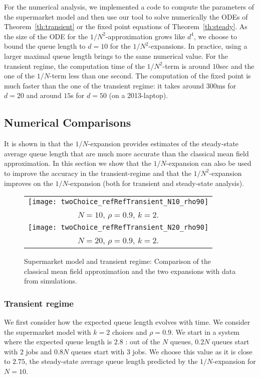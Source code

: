 \documentclass[sigconf]{acmart}
\begin{document}
For the numerical analysis, we implemented a code to compute the
parameters of the supermarket model and then use our tool
\cite{rmfTool2018} to solve numerically the ODEs of
Theorem~\ref{th:transient} or the fixed point equations of
Theorem~\ref{th:steady}. As the size of the ODE for the
$1/N^2$-approximation grows like $d^4$, we choose to bound the queue
length to $d=10$ for the $1/N^2$-expansions. In practice, using a
larger maximal queue length brings to the same numerical value.  For
the transient regime, the computation time of the $1/N^2$-term is
around $10$sec and the one of the $1/N$-term less than one second.
The computation of the fixed point is much faster than the one of the
transient regime: it takes around $300$ms for $d=20$ and around $15$s
for $d=50$ (on a 2013-laptop).


\subsection{Numerical Comparisons}

It is shown in \cite{gast2017refined} that the $1/N$-expansion
provides estimates of the steady-state average queue length that are
much more accurate than the classical mean field approximation. In
this section we show that the $1/N$-expansion can also be used to
improve the accuracy in the transient-regime and that the
$1/N^2$-expansion improves on the $1/N$-expansion (both for transient
and steady-state analysis).


\begin{figure}[t]
  \centering
  \begin{tabular}{c}
    \texttt{[image: twoChoice\_refRefTransient\_N10\_rho90]}\\
    $N=10$, $\rho=0.9$, $k=2$. \\
    \texttt{[image: twoChoice\_refRefTransient\_N20\_rho90]}\\
    $N=20$, $\rho=0.9$, $k=2$.
  \end{tabular}
  \caption{Supermarket model and transient regime: Comparison of the
    classical mean field approximation and the two expansions with
    data from simulations. }
  \label{fig:supermarket-transient}
\end{figure}


\subsubsection{Transient regime}

We first consider how the expected queue length evolves with time.
We consider the supermarket model with $k=2$ choices and
$\rho=0.9$. We start in a system where the expected queue length is
$2.8$ : out of the $N$ queues, $0.2N$ queues start with $2$ jobs and
$0.8N$ queues start with $3$ jobs. We choose this value as it is close
to $2.75$, the steady-state average queue length predicted by the
$1/N$-expansion for $N=10$.
\end{document}
